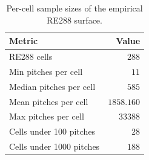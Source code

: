 \begin{table}[h]
\centering
\caption{Per-cell sample sizes of the empirical RE288 surface.}
\label{tab:re288samples}
\small
\begin{tabular}{lr}
\toprule
Metric & Value \\
\midrule
RE288 cells & $288$ \\
Min pitches per cell & $11$ \\
Median pitches per cell & $585$ \\
Mean pitches per cell & $1858.160$ \\
Max pitches per cell & $33388$ \\
Cells under 100 pitches & $28$ \\
Cells under 1000 pitches & $188$ \\
\bottomrule
\end{tabular}
\end{table}
